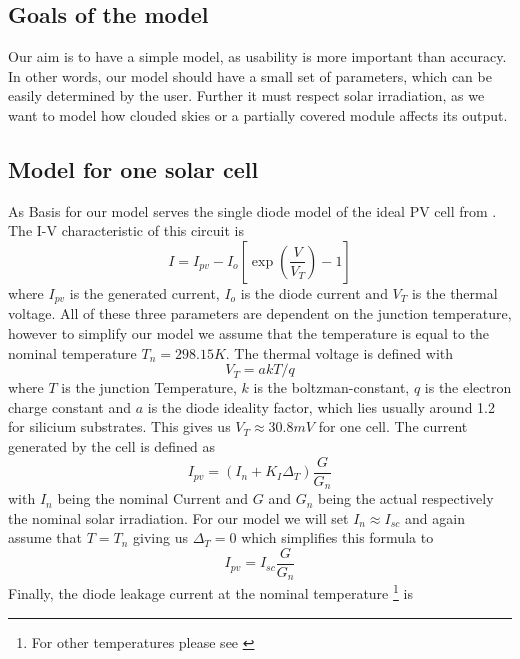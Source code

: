 \subsection{Goals of the model}

Our aim is to have a simple model, as usability is more important than accuracy.
In  other words, our model should have a small set of parameters, which  can  be
easily determined by the  user. Further it must respect solar irradiation, as we
want  to  model  how clouded skies or a partially  covered  module  affects  its
output.


\subsection{Model for one solar cell}

As Basis for our model serves the single diode model of  the  ideal PV cell from
\cite{ref:villa:pvmodel}  . The I-V characteristic of
this circuit is
\begin{equation} \label{eq:IV_old}
 I = I_{pv} - I_o \left[ \exp \left( \frac{V}{V_T} \right) - 1 \right]
\end{equation}
where $I_{pv}$ is the generated current, $I_o$ is the diode current and $V_T$ is
the thermal voltage. All of these three parameters are dependent on the junction
temperature, however to simplify our model  we  assume  that  the temperature is
equal to the nominal temperature $T_n = 298.15K$. The thermal voltage is defined
with
\begin{equation}
    V_T = a k T / q
\end{equation}
where $T$ is the junction Temperature,  $k$ is the boltzman-constant, $q$ is the
electron charge constant and $a$  is  the  diode  ideality  factor,  which  lies
usually around 1.2 for silicium substrates. This  gives  us $V_T \approx 30.8mV$
for one cell. The current generated by the cell is defined as
\begin{equation}
    I_{pv} = \left( I_n + K_I \Delta_T \right) \frac{G}{G_n}
\end{equation}
with  $I_n$  being  the  nominal  Current  and  $G$  and $G_n$ being the  actual
respectively  the nominal solar irradiation. For our  model  we  will  set  $I_n
\approx I_{sc}$ and again assume that $T  =  T_n$ giving us $\Delta_T = 0$ which
simplifies this formula to
\begin{equation} \label{eq:I_pv}
    I_{pv} = I_{sc} \frac{G}{G_n}
\end{equation}
Finally, the  diode  leakage  current  at  the nominal temperature \footnote{For
other temperatures please see \cite{ref:villa:pvmodel}} is
